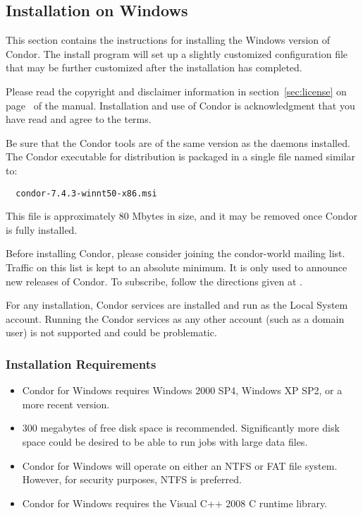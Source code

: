 \subsection{\label{sec:Windows-Install}Installation on Windows}

This section contains the instructions for 
installing the Windows version of Condor.  
The install program will set up a slightly customized configuration
file that may be further customized after the installation has completed.

Please read the copyright and disclaimer information in 
section~\ref{sec:license} on
page~\pageref{sec:license} of the manual.
Installation and
use of Condor is acknowledgment that you have read and agree to the
terms.

Be sure that the Condor tools are of the same version
as the daemons installed.
The Condor executable for distribution is packaged in
a single file named similar to:
\begin{verbatim}
  condor-7.4.3-winnt50-x86.msi
\end{verbatim}
This file is approximately 80 Mbytes in size, and it may be
removed once Condor is fully installed.

Before installing Condor, please consider joining the condor-world mailing
list.  Traffic on this list is kept to an absolute minimum.  It is only
used to announce new releases of Condor.
To subscribe, follow the directions given at
.

For any installation, Condor services are installed and run as the
Local System account.
Running the Condor services as any other account (such as a domain user) 
is not supported and could be problematic.
 
\subsubsection{Installation Requirements}

\begin{itemize}

\item Condor for Windows requires Windows 2000 SP4, Windows XP SP2, 
or a more recent version.

\item 300 megabytes of free disk space is recommended.  Significantly more 
disk space could be desired to be able to run jobs with large data files.

\item Condor for Windows will operate on either an NTFS or FAT file system.  However, for security purposes, NTFS is preferred.

\item Condor for Windows requires the Visual C++ 2008 C runtime library.
\end{itemize}


